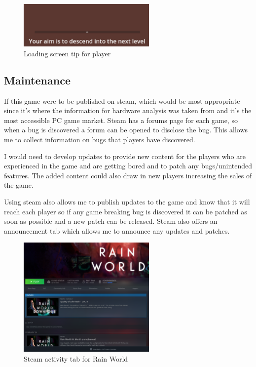 \documentclass{article}
\newcommand{\parBr}{\vspace{5mm}}%
\begin{document}
\begin{figure}[H]
\centering
\includegraphics[width = 0.6\textwidth]{load menu tip}
\caption{Loading screen tip for player}
\label{load_tip}
\end{figure}

\subsection{Maintenance}
If this game were to be published on steam, which would be most appropriate since it's where the information for hardware analysis was taken from and it's the most accessible PC game market. Steam has a forums page for each game, so when a bug is discovered a forum can be opened to disclose the bug. This allows me to collect information on bugs that players have discovered.

\parBr

I would need to develop updates to provide new content for the players who are experienced in the game and are getting bored and to patch any bugs/unintended features. The added content could also draw in new players increasing the sales of the game.

\parBr

Using steam also allows me to publish updates to the game and know that it will reach each player so if any game breaking bug is discovered it can be patched as soon as possible and a new patch can be released. Steam also offers an announcement tab which allows me to announce any updates and patches. 

\begin{figure}[H]
\centering
\includegraphics[width = 0.6\textwidth]{activity tab}
\caption{Steam activity tab for Rain World}
\label{activity_tab}
\end{figure}
\end{document}
